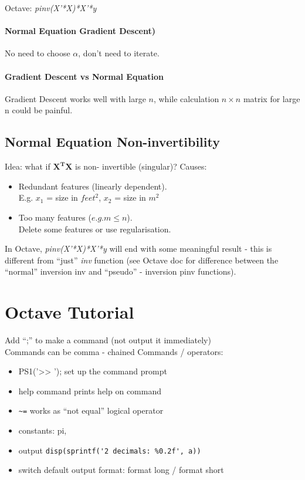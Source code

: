\documentclass{scrartcl}
\begin{document}
Octave: \emph{ pinv(X'*X)*X'*y }

\paragraph {Normal Equation Gradient Descent)} No need to choose
$\alpha$, don't need to iterate.

\paragraph {Gradient Descent vs Normal Equation} Gradient Descent
works well with large $n$, while calculation $n \times n$ matrix for
large n could be painful.

\subsection {Normal Equation Non-invertibility}
Idea: what if $\mathbf{X^TX}$ is non- invertible (singular)?
Causes:\begin{itemize}
\item Redundant features (linearly dependent). \\
  E.g. $x_1$ = size in $feet^2$, $x_2$ = size in $m^2$
\item Too many features ($e.g. m \leq n$). \\
  Delete some features or use regularisation.

\end{itemize}

In Octave, \emph{pinv(X'*X)*X'*y} will end with some meaningful result
- this is different from ``just'' \emph{inv} function (see Octave doc
for difference between the ``normal'' inversion inv and ``pseudo'' -
inversion pinv functions).

\section {Octave Tutorial}
\label {Chapter 5}
Add ``;'' to make a command (not output it immediately)\\
Commands can be comma - chained Commands / operators:\begin{itemize}
\item {PS1('>> ');} set up the command prompt
\item {help command} prints help on command
\item {\verb!~=!} works as ``not equal'' logical operator
\item {constants}: pi,
\item {output} \verb!disp(sprintf('2 decimals: %0.2f', a))!
\item {switch default output format}: format long / format short
\end{itemize}
\end{document}
